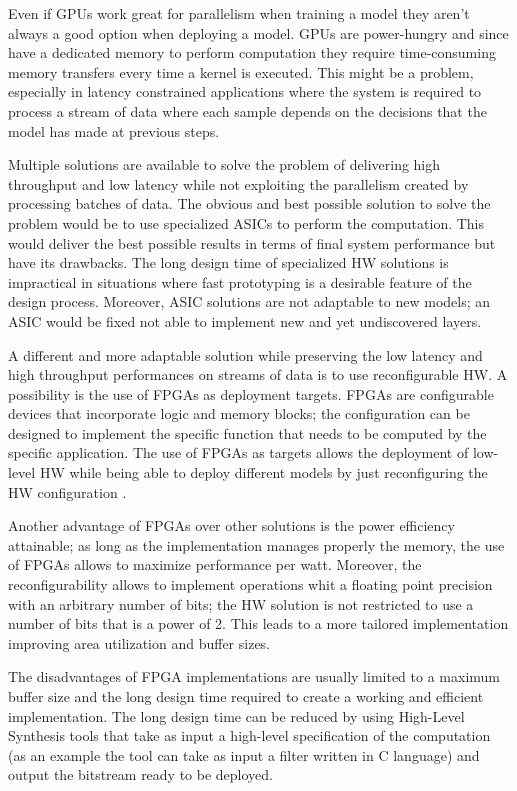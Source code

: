 \documentclass[../main.tex]{subfiles}
\begin{document}
Even if GPUs work great for parallelism when training a model they aren't always a good option when deploying a model.
GPUs are power-hungry and since have a dedicated memory to perform computation they require time-consuming memory transfers every time a kernel is executed.
This might be a problem, especially in latency constrained applications where the system is required to process a stream of data where each sample depends on the decisions that the model has made at previous steps.

Multiple solutions are available to solve the problem of delivering high throughput and low latency while not exploiting the parallelism created by processing batches of data. The obvious and best possible solution to solve the problem would be to use specialized ASICs to perform the computation. This would deliver the best possible results in terms of final system performance but have its drawbacks. 
The long design time of specialized HW solutions is impractical in situations where fast prototyping is a desirable feature of the design process. 
Moreover, ASIC solutions are not adaptable to new models; an ASIC would be fixed not able to implement new and yet undiscovered layers.

A different and more adaptable solution while preserving the low latency and high throughput performances on streams of data is to use reconfigurable HW.
A possibility is the use of FPGAs as deployment targets.
FPGAs are configurable devices that incorporate logic and memory blocks; the configuration can be designed to implement the specific function that needs to be computed by the specific application.
The use of FPGAs as targets allows the deployment of low-level HW while being able to deploy different models by just reconfiguring the HW configuration \cite{DBLP:journals/corr/abs-1901-04988}.

Another advantage of FPGAs over other solutions is the power efficiency attainable; as long as the implementation manages properly the memory, the use of FPGAs allows to maximize performance per watt.
Moreover, the reconfigurability allows to implement operations whit a floating point precision with an arbitrary number of bits; the HW solution is not restricted to use a number of bits that is a power of 2. This leads to a more tailored implementation improving area utilization and buffer sizes.

The disadvantages of FPGA implementations are usually limited to a maximum buffer size and the long design time required to create a working and efficient implementation.
The long design time can be reduced by using High-Level Synthesis tools that take as input a high-level specification of the computation (as an example the tool can take as input a filter written in C language) and output the bitstream ready to be deployed.
\end{document}
